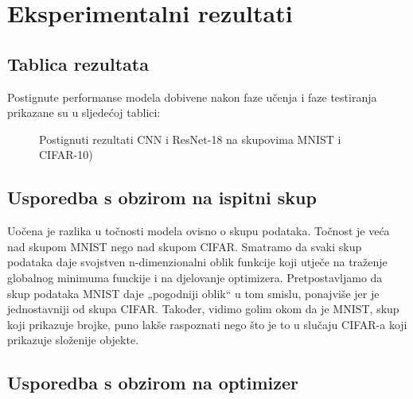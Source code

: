 \chapter{Eksperimentalni rezultati}

\section{Tablica rezultata}

Postignute performanse modela dobivene nakon faze učenja i faze testiranja prikazane su u sljedećoj tablici:

\begin{figure}[h]
	\caption{Postignuti rezultati CNN i ResNet-18 na skupovima MNIST i CIFAR-10)}
	\label{performancetable}
\end{figure}

\bigskip

\section{Usporedba s obzirom na ispitni skup}

Uočena je razlika u točnosti modela ovisno o skupu podataka. Točnost je veća nad skupom MNIST nego nad skupom CIFAR. Smatramo da svaki skup podataka daje svojstven n-dimenzionalni oblik funkcije koji utječe na traženje globalnog minimuma funckije i na djelovanje optimizera. Pretpostavljamo da skup podataka MNIST daje „pogodniji oblik“ u tom smislu, ponajviše jer je jednostavniji od skupa CIFAR.  Također, vidimo golim okom da je MNIST, skup koji prikazuje brojke, puno lakše raspoznati nego što je to u slučaju CIFAR-a koji prikazuje složenije objekte.

\bigskip

\section{Usporedba s obzirom na optimizer}

